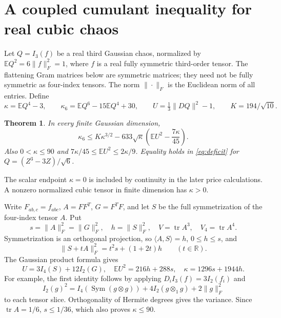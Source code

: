 \documentclass[11pt]{article}
\newcommand{\R}{\mathbb R}
\newcommand{\E}{\mathbb E}
\newcommand{\tr}{\operatorname{tr}}
\newtheorem{theorem}{Theorem}
\begin{document}
\section{A coupled cumulant inequality for real cubic chaos}\label{sec:cumulants}
Let $Q=I_3(f)$ be a real third Gaussian chaos, normalized by
$\E Q^2=6\|f\|_F^2=1$, where $f$ is a real fully symmetric
third-order tensor. The flattening Gram matrices below are symmetric
matrices; they need not be fully symmetric as four-index tensors.
The norm $\|\cdot\|_F$ is the Euclidean norm of all entries. Define
\[
 \kappa=\E Q^4-3,\qquad \kappa_6=\E Q^6-15\E Q^4+30,
 \qquad U=\tfrac13\|DQ\|^2-1,
 \qquad K=194/\sqrt{10}.
\]
\begin{theorem}\label{thm:633}
In every finite Gaussian dimension,
\begin{equation}\label{eq:deficit}
 \kappa_6\le K\kappa^{3/2}
 -633\sqrt\kappa\left(\E U^2-\frac{7\kappa}{45}\right).
\end{equation}
Also $0<\kappa\le90$ and
$7\kappa/45\le\E U^2\le2\kappa/9$. Equality holds in
\eqref{eq:deficit} for $Q=(Z^3-3Z)/\sqrt6$.
\end{theorem}

The scalar endpoint $\kappa=0$ is included by continuity in the later
price calculations. A nonzero normalized cubic tensor in finite dimension
has $\kappa>0$.

Write $F_{ab,c}=f_{abc}$, $A=FF^T$, $G=F^TF$, and let $S$ be the full
symmetrization of the four-index tensor $A$. Put
\[
 s=\|A\|_F^2=\|G\|_F^2,\quad h=\|S\|_F^2,
 \quad V=\tr A^3,\quad V_4=\tr A^4.
\]
Symmetrization is an orthogonal projection, so
$\langle A,S\rangle=h$, $0\le h\le s$, and
\begin{equation}\label{eq:snorm}
 \|S+tA\|_F^2=t^2s+(1+2t)h \qquad(t\in\R).
\end{equation}
The Gaussian product formula gives
\begin{equation}\label{eq:products}
 U=3I_4(S)+12I_2(G),\quad
 \E U^2=216h+288s,\quad \kappa=1296s+1944h.
\end{equation}
For example, the first identity follows by applying
$D_iI_3(f)=3I_2(f_i)$ and
\[
 I_2(g)^2=I_4(\operatorname{Sym}(g\otimes g))
 +4I_2(g\otimes_1 g)+2\|g\|_F^2
\]
to each tensor slice. Orthogonality of Hermite degrees gives the variance.
Since $\tr A=1/6$, $s\le1/36$, which also proves $\kappa\le90$.
\end{document}
